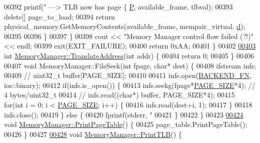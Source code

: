 \begin{DoxyCode}
{{{{{{{{{{{{{{{{{{{{{{{{{{{{{{{{{00392             printf(\textcolor{stringliteral}{" ---> TLB now has page \{%
      \hyperlink{structMemoryPairAddress__t_a5bc11426b27565b959f280dd1a18b080}{P}, available\_frame, tlbval);
00393             \textcolor{keyword}{delete}[] page\_to\_load;
00394             \textcolor{keywordflow}{return} physical\_memory.GetMemoryContents(available\_frame, mempair\_virtual.
      \hyperlink{structMemoryPairAddress__t_ad608e86288286889c2658e8043414edf}{d});
00395 
00396         \}
00397     \}
00398     cout << \textcolor{stringliteral}{"Memory Manager control flow failed (?!)"} << endl;
00399     exit(EXIT\_FAILURE);
00400     \textcolor{keywordflow}{return} 0xAA;
00401 \}
00402 
\hypertarget{memory_8cpp_source.tex_l00403}{}\hyperlink{classMemoryManager_a905ceff7ad39c05c2d965af613156547}{00403} \textcolor{keywordtype}{int} \hyperlink{classMemoryManager_a905ceff7ad39c05c2d965af613156547}{MemoryManager::TranslateAddress}(\textcolor{keywordtype}{int} addr) \{
00404     \textcolor{keywordflow}{return} 0;
00405 \}
00406 
00407 \textcolor{keywordtype}{void} MemoryManager::FileSeek(\textcolor{keywordtype}{int} fpage, \textcolor{keywordtype}{char}* dest) \{
00408     ifstream infs;
00409     \textcolor{comment}{// uint32\_t buffer[PAGE\_SIZE];}
00410 
00411     infs.open(\hyperlink{memory_8h_a478707addabe7b0aedaa632b70394d75}{BACKEND\_FN}, ios::binary);
00412     \textcolor{keywordflow}{if}(infs.is\_open()) \{
00413         infs.seekg(fpage*\hyperlink{memory_8h_a7d467c1d283fdfa1f2081ba1e0d01b6e}{PAGE\_SIZE}*4); \textcolor{comment}{// 4 bytes/uint32\_t}
00414         \textcolor{comment}{// infs.read((char*) buffer, PAGE\_SIZE*4);}
00415         \textcolor{keywordflow}{for}(\textcolor{keywordtype}{int} i = 0; i < \hyperlink{memory_8h_a7d467c1d283fdfa1f2081ba1e0d01b6e}{PAGE\_SIZE}; i++) \{
00416             infs.read(dest+i, 1);
00417         \}
00418         infs.close();
00419     \} \textcolor{keywordflow}{else} \{
00420         fprintf(stderr, \textcolor{stringliteral}{"%
00421     \}
00422 \}
00423 
\hypertarget{memory_8cpp_source.tex_l00424}{}\hyperlink{classMemoryManager_aa7437efdc1ebd09895d451e2c521857a}{00424} \textcolor{keywordtype}{void} \hyperlink{classMemoryManager_aa7437efdc1ebd09895d451e2c521857a}{MemoryManager::PrintPageTable}() \{
00425     page\_table.PrintPageTable();
00426 \}
00427 
\hypertarget{memory_8cpp_source.tex_l00428}{}\hyperlink{classMemoryManager_a4bc5f491976e5253bf00a07a71b55ef6}{00428} \textcolor{keywordtype}{void} \hyperlink{classMemoryManager_a4bc5f491976e5253bf00a07a71b55ef6}{MemoryManager::PrintTLB}() \{
}}}}}}}}}}}}}}}}}}}}}}}}}}}}}}}}}}}
\end{DoxyCode}
